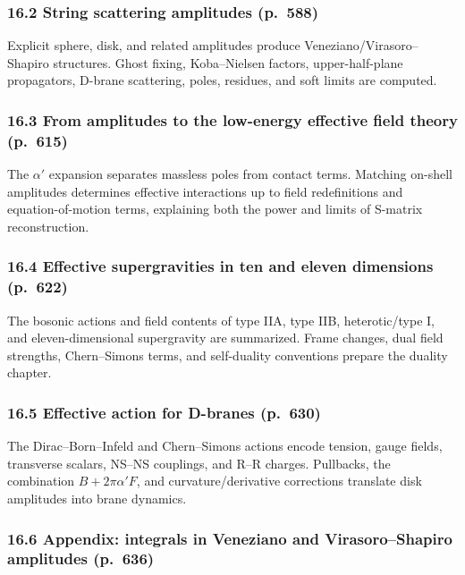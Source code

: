 \documentclass[
  10pt,
  a4paper,
  openany]{book}
\begin{document}
\subsubsection{16.2 String scattering amplitudes
(p.~588)}\label{string-scattering-amplitudes-p.-588}

Explicit sphere, disk, and related amplitudes produce
Veneziano/Virasoro--Shapiro structures. Ghost fixing, Koba--Nielsen
factors, upper-half-plane propagators, D-brane scattering, poles,
residues, and soft limits are computed.

\subsubsection{16.3 From amplitudes to the low-energy effective field
theory
(p.~615)}\label{from-amplitudes-to-the-low-energy-effective-field-theory-p.-615}

The \(\alpha'\) expansion separates massless poles from contact terms.
Matching on-shell amplitudes determines effective interactions up to
field redefinitions and equation-of-motion terms, explaining both the
power and limits of S-matrix reconstruction.

\subsubsection{16.4 Effective supergravities in ten and eleven
dimensions
(p.~622)}\label{effective-supergravities-in-ten-and-eleven-dimensions-p.-622}

The bosonic actions and field contents of type IIA, type IIB,
heterotic/type I, and eleven-dimensional supergravity are summarized.
Frame changes, dual field strengths, Chern--Simons terms, and
self-duality conventions prepare the duality chapter.

\subsubsection{16.5 Effective action for D-branes
(p.~630)}\label{effective-action-for-d-branes-p.-630}

The Dirac--Born--Infeld and Chern--Simons actions encode tension, gauge
fields, transverse scalars, NS--NS couplings, and R--R charges.
Pullbacks, the combination \(B+2\pi\alpha'F\), and curvature/derivative
corrections translate disk amplitudes into brane dynamics.

\subsubsection{16.6 Appendix: integrals in Veneziano and
Virasoro--Shapiro amplitudes
(p.~636)}\label{appendix-integrals-in-veneziano-and-virasoroshapiro-amplitudes-p.-636}
\end{document}
